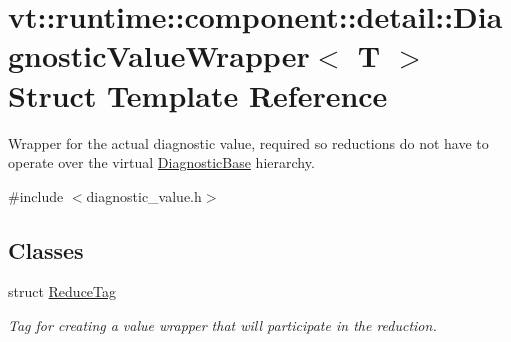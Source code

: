 \hypertarget{structvt_1_1runtime_1_1component_1_1detail_1_1_diagnostic_value_wrapper}{}\section{vt\+:\+:runtime\+:\+:component\+:\+:detail\+:\+:Diagnostic\+Value\+Wrapper$<$ T $>$ Struct Template Reference}
\label{structvt_1_1runtime_1_1component_1_1detail_1_1_diagnostic_value_wrapper}


Wrapper for the actual diagnostic value, required so reductions do not have to operate over the virtual {\ttfamily \hyperlink{structvt_1_1runtime_1_1component_1_1detail_1_1_diagnostic_base}{Diagnostic\+Base}} hierarchy.  




{\ttfamily \#include $<$diagnostic\+\_\+value.\+h$>$}

\subsection*{Classes}
\begin{DoxyCompactItemize}
\item 
struct \hyperlink{structvt_1_1runtime_1_1component_1_1detail_1_1_diagnostic_value_wrapper_1_1_reduce_tag}{Reduce\+Tag}
\begin{DoxyCompactList}\small\item\em Tag for creating a value wrapper that will participate in the reduction. \end{DoxyCompactList}\end{DoxyCompactItemize}
